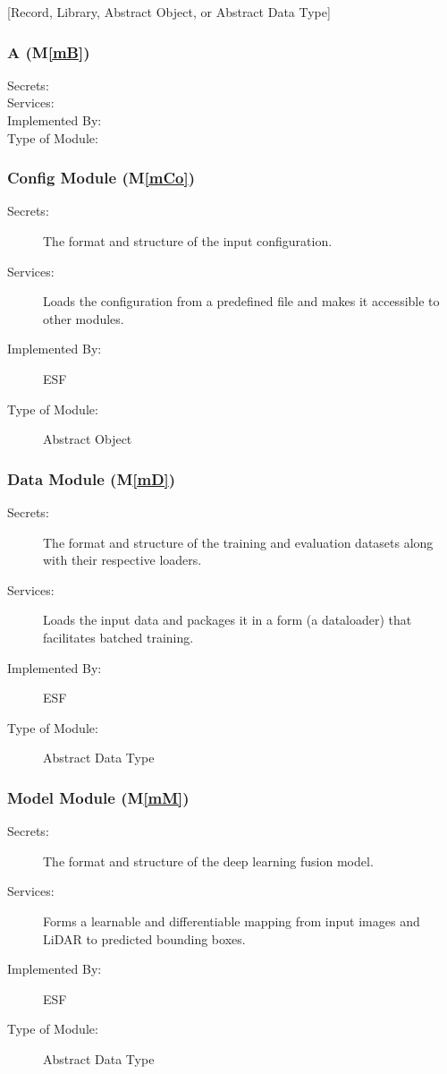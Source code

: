 \documentclass[12pt, titlepage]{article}
\newcommand{\ProjectName}{ESF }
\newcommand{\mref}[1]{M\ref{#1}}
\begin{document}
[Record, Library, Abstract Object, or Abstract Data Type]
\subsubsection{A (\mref{mB})}
\begin{description}
\item[Secrets:] 
\item[Services:]
\item[Implemented By:] 
\item[Type of Module:] 
\end{description}

\subsubsection{Config Module (\mref{mCo})}
\begin{description}
\item[Secrets:] The format and structure of the input configuration.
\item[Services:] Loads the configuration from a predefined file and makes it accessible to other modules.
\item[Implemented By:] \ProjectName{} 
\item[Type of Module:] Abstract Object
\end{description}

\subsubsection{Data Module (\mref{mD})}
\begin{description}
\item[Secrets:] The format and structure of the training and evaluation datasets along with their respective loaders.
\item[Services:] Loads the input data and packages it in a form (a dataloader) that facilitates batched training.
\item[Implemented By:] \ProjectName{}
\item[Type of Module:] Abstract Data Type
\end{description}

\subsubsection{Model Module (\mref{mM})}
\begin{description}
\item[Secrets:] The format and structure of the deep learning fusion model.
\item[Services:] Forms a learnable and differentiable mapping from input images and LiDAR to predicted bounding boxes.
\item[Implemented By:] \ProjectName{}
\item[Type of Module:] Abstract Data Type
\end{description}
\end{document}
